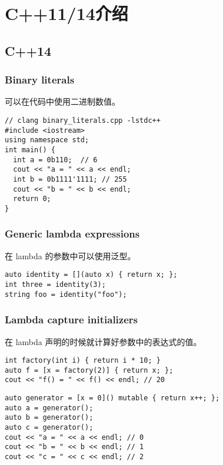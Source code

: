 \chapter{C++11/14介绍}

\section{C++14}

\subsection{Binary literals}

可以在代码中使用二进制数值。

\begin{verbatim}
// clang binary_literals.cpp -lstdc++
#include <iostream>
using namespace std;
int main() {
  int a = 0b110;  // 6
  cout << "a = " << a << endl;
  int b = 0b1111'1111; // 255
  cout << "b = " << b << endl;
  return 0;
}
\end{verbatim}

\subsection{Generic lambda expressions}

在 lambda 的参数中可以使用泛型。

\begin{verbatim}
auto identity = [](auto x) { return x; };
int three = identity(3);
string foo = identity("foo");
\end{verbatim}

\subsection{Lambda capture initializers}

在 lambda 声明的时候就计算好参数中的表达式的值。

\begin{verbatim}
int factory(int i) { return i * 10; }
auto f = [x = factory(2)] { return x; };
cout << "f() = " << f() << endl; // 20
\end{verbatim}

\begin{verbatim}
auto generator = [x = 0]() mutable { return x++; };
auto a = generator();
auto b = generator();
auto c = generator();
cout << "a = " << a << endl; // 0
cout << "b = " << b << endl; // 1
cout << "c = " << c << endl; // 2
\end{verbatim}


